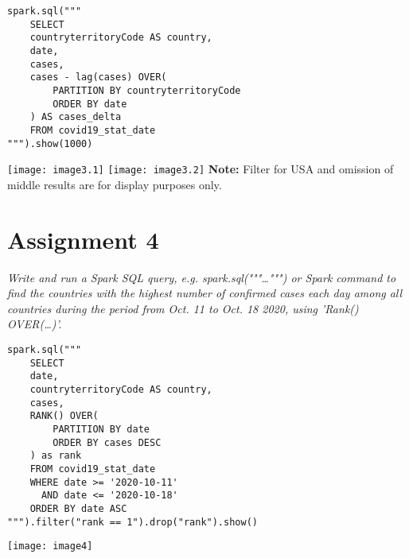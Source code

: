 \documentclass[]{article}
\begin{document}
\begin{verbatim}
spark.sql("""
	SELECT
	countryterritoryCode AS country,
	date,
	cases,
	cases - lag(cases) OVER(
		PARTITION BY countryterritoryCode
		ORDER BY date
	) AS cases_delta
	FROM covid19_stat_date
""").show(1000)
\end{verbatim}
\texttt{[image: image3.1]} %
\texttt{[image: image3.2]} %
\textbf{Note:} Filter for USA and omission of middle results are for display purposes only.

\clearpage 

\section*{Assignment 4}
\emph{ Write and run a Spark SQL query, e.g. spark.sql("""\ldots""") or Spark command to find the 	countries with the highest number of confirmed cases each day among all countries during the period from Oct. 11 to Oct. 18 2020, using 'Rank() OVER(\ldots)'. }

\begin{verbatim}
spark.sql("""
	SELECT
	date,
	countryterritoryCode AS country,
	cases,
	RANK() OVER(
		PARTITION BY date
		ORDER BY cases DESC
	) as rank
	FROM covid19_stat_date
	WHERE date >= '2020-10-11'
	  AND date <= '2020-10-18'
	ORDER BY date ASC
""").filter("rank == 1").drop("rank").show()
\end{verbatim}
\texttt{[image: image4]} %
\end{document}

